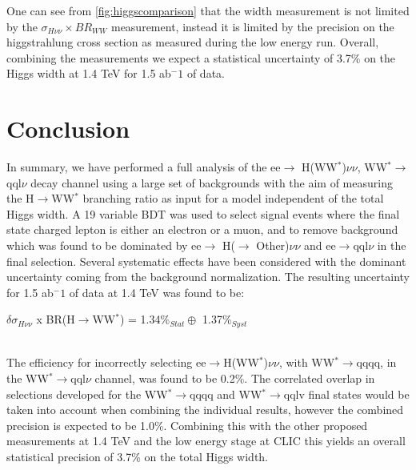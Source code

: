 One can see from \ref{fig:higgscomparison} that the width measurement is not limited by the $\sigma_{H\nu\nu}\times BR_{WW}$ measurement, instead it is limited by the precision on the higgstrahlung cross section as measured during the low energy run. Overall, combining the measurements we expect a statistical uncertainty of 3.7\% on the Higgs width at 1.4 TeV for 1.5 ab${^-1}$ of data.

\section{Conclusion}

In summary, we have performed a full analysis of the ee$\rightarrow$ H(WW$^*$)$\nu\nu$, WW$^*\rightarrow$qql$\nu$ decay channel using a large set of backgrounds with the aim of measuring the H$\rightarrow$WW$^*$ branching ratio as input for a model independent of the total Higgs width. A 19 variable BDT was used to select signal events where the final state charged lepton is either an electron or a muon, and to remove background which was found to be dominated by ee$\rightarrow$ H($\rightarrow$ Other)$\nu\nu$  and ee$\rightarrow$qql$\nu$ in the final selection. Several systematic effects have been considered with the dominant uncertainty coming from the background normalization. The resulting uncertainty for 1.5 ab${^-1}$ of data at 1.4 TeV was found to be: \\[10pt]\centerline{\large{$\delta\sigma_{H\nu\nu}$ x BR(H$\rightarrow$WW$^*$) = 1.34\%$_{Stat} \oplus$ 1.37\%$_{Syst}$}} \\[10pt] The efficiency for incorrectly selecting ee$\rightarrow$H(WW$^*$)$\nu\nu$, with WW$^*\rightarrow$qqqq, in the WW$^*\rightarrow$qql$\nu$ channel, was found to be 0.2\%. The correlated overlap in selections developed for the WW$^*\rightarrow$qqqq and WW$^*\rightarrow$qqlv final states would be taken into account when combining the individual results, however the combined precision is expected to be 1.0\%. Combining this with the other proposed measurements at 1.4 TeV and the low energy stage at CLIC this yields an overall statistical precision of 3.7\% on the total Higgs width.




